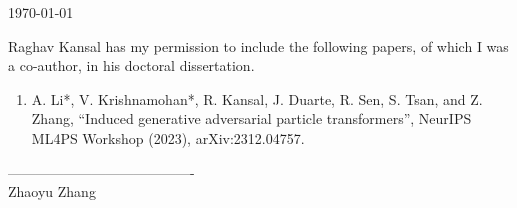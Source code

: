 \documentclass{article}
\begin{document}
\today

Raghav Kansal has my permission to include the following papers, of which
I was a co-author, in his doctoral dissertation.

\begin{enumerate}
    \item A. Li*, V. Krishnamohan*, R. Kansal, J. Duarte, R. Sen, S. Tsan, and Z. Zhang, “Induced generative adversarial particle transformers”, NeurIPS ML4PS Workshop (2023), arXiv:2312.04757.
\end{enumerate}

\baselineskip
----------------------------------------\\
Zhaoyu Zhang
\end{document}
